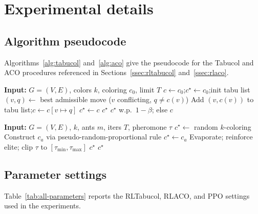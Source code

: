 \section{Experimental details}
\label{app:experimental-details}

\subsection{Algorithm pseudocode}

Algorithms~\ref{alg:tabucol} and~\ref{alg:aco} give the pseudocode for
the Tabucol and ACO procedures referenced in
Sections~\ref{ssec:rltabucol} and~\ref{ssec:rlaco}.

\begin{algorithm}[!htbp]
\caption{Tabucol procedure}
\label{alg:tabucol}
\begin{algorithmic}[1]
\State \textbf{Input:} $G=(V,E)$, colors $k$, coloring $c_0$, limit $T$
\State $c\leftarrow c_0$;\quad $c^\star\leftarrow c_0$;\quad init tabu list
  \State $(v,q)\leftarrow$ best admissible move ($v$ conflicting, $q\neq c(v)$)
  \State Add $(v,c(v))$ to tabu list;\quad $c\leftarrow c[v\mapsto q]$
   \State $c^\star\leftarrow c$ \EndIf
   \State \Return $c^\star$ \EndIf
\EndFor
\State \Return $c^\star$ w.p.\ $1-\beta$; else $c$
\end{algorithmic}
\end{algorithm}

\begin{algorithm}[!htbp]
\caption{ACO procedure}
\label{alg:aco}
\begin{algorithmic}[1]
\State \textbf{Input:} $G=(V,E)$, $k$, ants $m$, iters $T$, pheromone $\tau$
\State $c^\star\leftarrow$ random $k$-coloring
    \State Construct $c_a$ via pseudo-random-proportional rule
     \State $c^\star\leftarrow c_a$ \EndIf
  \EndFor
  \State Evaporate; reinforce elite; clip $\tau$ to $[\tau_{\min},\tau_{\max}]$
   \State \Return $c^\star$ \EndIf
\EndFor
\State \Return $c^\star$
\end{algorithmic}
\end{algorithm}

\subsection{Parameter settings}

\ifdefined\isieeetrue
  Table~\ref{tab:all-parameters} reports the RLTabucol, RLACO, and PPO
  settings used in the experiments.

